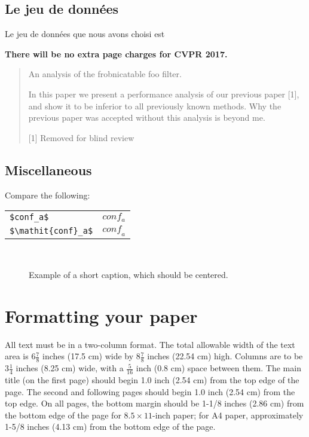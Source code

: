 \documentclass[10pt,twocolumn,letterpaper]{article}
\begin{document}
\subsection{Le jeu de données}
Le jeu de données que nous avons choisi est

{\bf There will be no extra page charges for
  CVPR 2017.}


\begin{quote}
\begin{center}
    An analysis of the frobnicatable foo filter.
\end{center}

   In this paper we present a performance analysis of our
   previous paper [1], and show it to be inferior to all
   previously known methods.  Why the previous paper was
   accepted without this analysis is beyond me.

   [1] Removed for blind review
\end{quote}


\subsection{Miscellaneous}

\noindent
Compare the following:\\
\begin{tabular}{ll}
 \verb'$conf_a$' &  $conf_a$ \\
 \verb'$\mathit{conf}_a$' & $\mathit{conf}_a$
\end{tabular}\\


\begin{figure*}
\begin{center}
\fbox{\rule{0pt}{2in} \rule{.9\linewidth}{0pt}}
\end{center}
   \caption{Example of a short caption, which should be centered.}
\label{fig:short}
\end{figure*}

\section{Formatting your paper}

All text must be in a two-column format. The total allowable width of the
text area is $6\frac78$ inches (17.5 cm) wide by $8\frac78$ inches (22.54
cm) high. Columns are to be $3\frac14$ inches (8.25 cm) wide, with a
$\frac{5}{16}$ inch (0.8 cm) space between them. The main title (on the
first page) should begin 1.0 inch (2.54 cm) from the top edge of the
page. The second and following pages should begin 1.0 inch (2.54 cm) from
the top edge. On all pages, the bottom margin should be 1-1/8 inches (2.86
cm) from the bottom edge of the page for $8.5 \times 11$-inch paper; for A4
paper, approximately 1-5/8 inches (4.13 cm) from the bottom edge of the
page.
\end{document}
